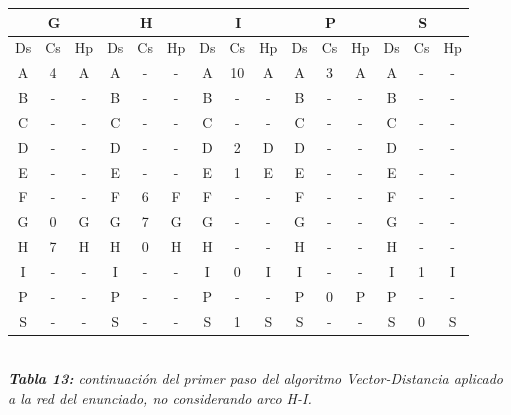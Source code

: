 \documentclass[letterpaper,10pt,onecolumn,titlepage]{article}
\begin{document}
  \begin{center}
   \begin{tabular}{|c|c|c|c|c|c|c|c|c|c|c|c|c|c|c|} \hline
     \multicolumn{3}{|c|}{G} & \multicolumn{3}{|c|}{H} &\multicolumn{3}{|c|}{I} & \multicolumn{3}{|c|}{P} & \multicolumn{3}{|c|}{S}    \\ \hline
     Ds & Cs & Hp & Ds & Cs & Hp & Ds & Cs & Hp & Ds & Cs & Hp & Ds & Cs & Hp  \\ \hline
     A  & 4  & A  & A  & -  & -  & A  & 10  & A  & A  & 3  & A  & A  & -  & -   \\ \hline
     B  & -  & -  & B  & -  & -  & B  & -  & -  & B  & -  & -  & B  & -  & -   \\ \hline
     C  & -  & -  & C  & -  & -  & C  & -  & -  & C  & -  & -  & C  & -  & -   \\ \hline
     D  & -  & -  & D  & -  & -  & D  & 2  & D  & D  & -  & -  & D  & -  & -   \\ \hline
     E  & -  & -  & E  & -  & -  & E  & 1  & E  & E  & -  & -  & E  & -  & -   \\ \hline
     F  & -  & -  & F  & 6  & F  & F  & -  & -  & F  & -  & -  & F  & -  & -   \\ \hline
     G  & 0  & G  & G  & 7  & G  & G  & -  & -  & G  & -  & -  & G  & -  & -   \\ \hline
     H  & 7  & H  & H  & 0  & H  & H  & -  & -  & H  & -  & -  & H  & -  & -   \\ \hline
     I  & -  & -  & I  & -  & -  & I  & 0  & I  & I  & -  & -  & I  & 1  & I   \\ \hline
     P  & -  & -  & P  & -  & -  & P  & -  & -  & P  & 0  & P  & P  & -  & -   \\ \hline
     S  & -  & -  & S  & -  & -  & S  & 1  & S  & S  & -  & -  & S  & 0  & S   \\ \hline
   \end{tabular}\\
   \textit{\textbf{Tabla 13:} continuación del primer paso del algoritmo Vector-Distancia aplicado a la red del enunciado, no considerando arco H-I.}
 \end{center}
 
\end{document}
